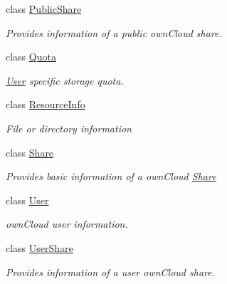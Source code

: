 \begin{DoxyCompactItemize}
class \hyperlink{classowncloudsharp_1_1_types_1_1_public_share}{Public\+Share}
\begin{DoxyCompactList}\small\item\em Provides information of a public own\+Cloud share. \end{DoxyCompactList}\item 
class \hyperlink{classowncloudsharp_1_1_types_1_1_quota}{Quota}
\begin{DoxyCompactList}\small\item\em \hyperlink{classowncloudsharp_1_1_types_1_1_user}{User} specific storage quota. \end{DoxyCompactList}\item 
class \hyperlink{classowncloudsharp_1_1_types_1_1_resource_info}{Resource\+Info}
\begin{DoxyCompactList}\small\item\em File or directory information \end{DoxyCompactList}\item 
class \hyperlink{classowncloudsharp_1_1_types_1_1_share}{Share}
\begin{DoxyCompactList}\small\item\em Provides basic information of a own\+Cloud \hyperlink{classowncloudsharp_1_1_types_1_1_share}{Share} \end{DoxyCompactList}\item 
class \hyperlink{classowncloudsharp_1_1_types_1_1_user}{User}
\begin{DoxyCompactList}\small\item\em own\+Cloud user information. \end{DoxyCompactList}\item 
class \hyperlink{classowncloudsharp_1_1_types_1_1_user_share}{User\+Share}
\begin{DoxyCompactList}\small\item\em Provides information of a user own\+Cloud share. \end{DoxyCompactList}\end{DoxyCompactItemize}
